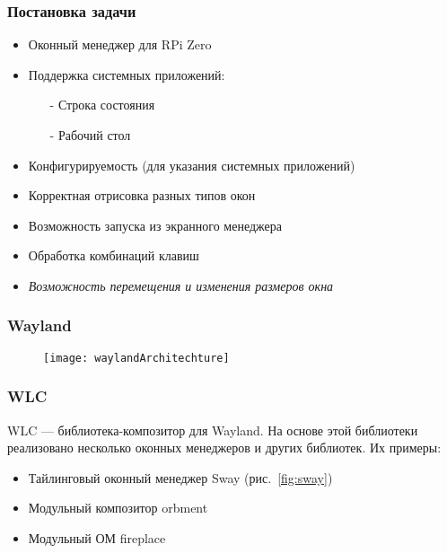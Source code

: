 \begin{frame}
\frametitle{Постановка задачи}

\begin{itemize}
\item Оконный менеджер для RPi Zero
\item Поддержка системных приложений:
	\begin{itemize}
	\item[-] Строка состояния
	\item[-] Рабочий стол
	\end{itemize}
\item Конфигурируемость (для указания системных приложений)
\item Корректная отрисовка разных типов окон
\item Возможность запуска из экранного менеджера
\item Обработка комбинаций клавиш
\item \textit{Возможность перемещения и изменения размеров окна}
\end{itemize}

\end{frame}


\begin{frame}
\frametitle{Wayland}

\begin{figure}[h!]
\texttt{[image: waylandArchitechture]}
\end{figure}

\end{frame}


\begin{frame}
\frametitle{WLC}

WLC --- библиотека-композитор для Wayland. На основе этой библиотеки реализовано несколько оконных менеджеров и других библиотек. Их примеры:
\begin{itemize}
\item Тайлинговый оконный менеджер Sway (рис.~\ref{fig:sway})
\item Модульный композитор orbment
\item Модульный ОМ fireplace
\end{itemize}

\end{frame}

